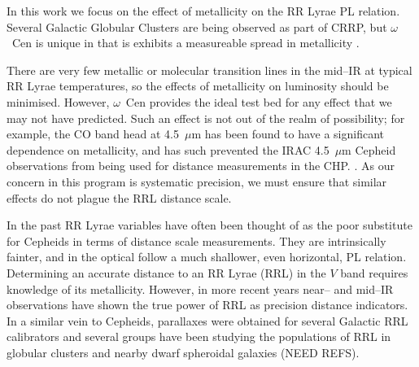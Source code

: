 In this work we focus on the effect of metallicity on the RR Lyrae PL relation. Several Galactic Globular Clusters are being observed as part of CRRP, but $\omega$~Cen is unique in that is exhibits a measureable spread in metallicity \citep{1975ApJ...201L..71F, 2007ApJ...663..296V, 2014ApJ...791..107V}.

There are very few metallic or molecular transition lines in the mid--IR at typical RR Lyrae temperatures, so the effects of metallicity on luminosity should be minimised. However, $\omega$~Cen provides the ideal test bed for any effect that we may not have predicted. Such an effect is not out of the realm of possibility; for example, the CO band head at 4.5~$\mu$m has been found to have a significant dependence on metallicity, and has such prevented the IRAC 4.5~$\mu$m Cepheid observations from being used for distance measurements in the CHP. \citep{2011ApJ...743...76S, 2012ApJ...759..146M, 2015arXiv150206995S}. As our concern in this program is systematic precision, we must ensure that similar effects do not plague the RRL distance scale.  


In the past RR Lyrae variables have often been thought of as the poor substitute for Cepheids in terms of distance scale measurements. They are intrinsically fainter, and in the optical follow a much shallower, even horizontal, PL relation. Determining an accurate distance to an RR Lyrae (RRL) in the $V$ band requires knowledge of its metallicity. However, in more recent years near-- and mid--IR observations have shown the true power of RRL as precision distance indicators. In a similar vein to Cepheids,  parallaxes were obtained for several Galactic RRL calibrators \citet{2011AJ....142..187B} and several groups have been studying the populations of RRL in globular clusters and nearby dwarf spheroidal galaxies (NEED REFS). 


